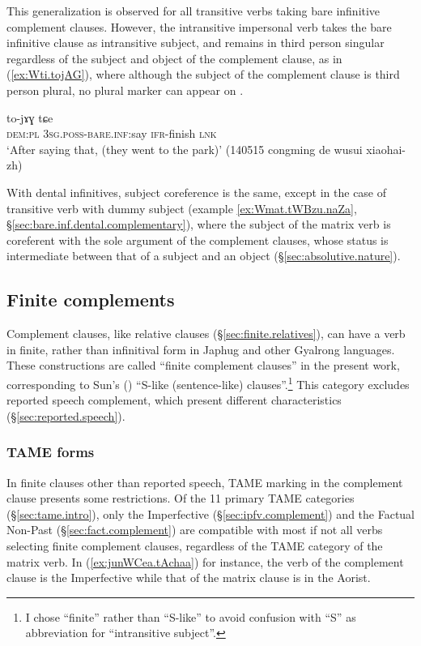 This generalization is observed for all transitive verbs taking bare infinitive complement clauses. However, the intransitive impersonal verb  takes the bare infinitive clause as intransitive subject, and remains in third person singular regardless of the subject and object of the complement clause, as in (\ref{ex:Wti.tojAG}), where although the subject of the complement clause is third person plural, no plural marker can appear on .

\begin{exe}
\ex \label{ex:Wti.tojAG}
\gll [nɯra ɯ-ti] to-jɤɣ tɕe \\
\textsc{dem}:\textsc{pl} \textsc{3sg}.\textsc{poss}-\textsc{bare}.\textsc{inf}:say \textsc{ifr}-finish \textsc{lnk}\\
\glt `After saying that, (they went to the park)' (140515 congming de wusui xiaohai-zh)
\end{exe}

With dental infinitives, subject coreference is the same, except in the case of transitive verb with dummy subject (example \ref{ex:Wmat.tWBzu.naZa}, §\ref{sec:bare.inf.dental.complementary}), where the subject of the matrix verb is coreferent with the sole argument of the complement clauses, whose status is intermediate between that of a subject and an object (§\ref{sec:absolutive.nature}).

 \subsection{Finite complements} \label{sec:finite.complement}
 Complement clauses, like relative clauses (§\ref{sec:finite.relatives}), can have a verb in finite, rather than infinitival form in Japhug and other Gyalrong languages. These constructions are called ``finite complement clauses'' in the present work, corresponding to Sun's (\citeyear[475-477]{sun12complementation})  ``S-like (sentence-like) clauses''.\footnote{I chose ``finite'' rather than ``S-like'' to avoid confusion with ``S'' as abbreviation for ``intransitive subject''.   } This category excludes reported speech complement, which present different characteristics (§\ref{sec:reported.speech}).

 \subsubsection{TAME forms} \label{sec:TAM.finite}
In finite clauses other than reported speech, TAME marking in the complement clause presents some restrictions. Of the 11 primary TAME categories (§\ref{sec:tame.intro}), only the Imperfective (§\ref{sec:ipfv.complement}) and the Factual Non-Past (§\ref{sec:fact.complement}) are compatible with most if not all verbs selecting finite complement clauses, regardless of the TAME category of the matrix verb. In (\ref{ex:junWCea.tAchaa}) for instance, the verb of the complement clause is the Imperfective while that of the matrix clause is in the Aorist.


